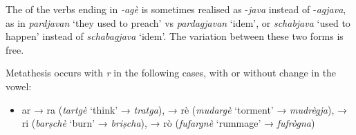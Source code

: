 The  of the verbs ending in \textit{-agè} is sometimes realised as -\textit{java} instead of -\textit{agjava}, as in \textit{pardjavan} `they used to preach' vs \textit{pardagjavan} `idem', or \textit{schabjava} `used to happen' instead of \textit{schabagjava} `idem'. The variation between these two forms is free.
	
Metathesis occurs with \textit{r} in the following cases, with or without change in the vowel:

\begin{itemize}
	\item ar → ra (\textit{tartgè} `think' → \textit{tratga}), → rè (\textit{mudargè} `torment' → \textit{mudrègja}), → ri (\textit{barṣchè} `burn' → \textit{briṣcha}), → rò (\textit{fufargnè} `rummage' → \textit{fufrògna})
\end{itemize}

